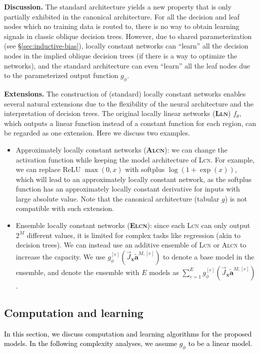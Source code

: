 \documentclass{article} \usepackage{iclr2020_conference,times}
\newcommand{\camera}[1]{\textcolor{black}{#1}}
\def\va{{\bm{a}}}
\def\vx{{\bm{x}}}
\newcommand{\xref}[1]{\S\ref{#1}}
\begin{document}
\textbf{Discussion.} The standard architecture yields a new property that is only partially exhibited in the canonical architecture. For all the decision and leaf nodes which no training data is routed to, there is no way to obtain learning signals in classic oblique decision trees. However, due to shared parameterization (see \xref{sec:inductive-bias}), locally constant networks can ``learn'' all the decision nodes in the implied oblique decision trees (if there is a way to optimize the networks), and the standard architecture can even ``learn'' all the leaf nodes due to the parameterized output function $g_\phi$.


\textbf{Extensions.} The construction of (standard) locally constant networks enables several natural extensions due to the flexibility of the neural architecture and the interpretation of decision trees. The original locally linear networks (\textbf{\textsc{Lln}}) $f_\theta$, which outputs a linear function instead of a constant function for each region, can be regarded as one extension. Here we discuss two examples.
\begin{itemize}[leftmargin=4mm]
\vspace{-2mm}
    \item {Approximately locally constant networks (\textbf{\textsc{Alcn}})}: we can change the activation function while keeping the model architecture of \textsc{Lcn}. For example, we can replace ReLU $\max(0, x)$ with softplus $\log(1 + \exp(x))$, which will lead to an approximately locally constant network, as the softplus function has an approximately locally constant derivative for inputs with large absolute value. Note that the canonical architecture (tabular $g$) is not compatible with such extension. 
\vspace{-1mm}
    \item Ensemble locally constant networks (\textbf{\textsc{Elcn}}): since each \textsc{Lcn} can only output $2^M$ different values, it is limited for complex tasks like regression (akin to decision trees). We can instead use an additive ensemble of \textsc{Lcn} or \textsc{Alcn} to increase the capacity. We use $g^{[e]}_{\phi}(\vec{J}_\vx \tilde \va^{M, [e]})$ to denote a base model in the ensemble, and denote the ensemble with $E$ models as $\sum_{e=1}^E g^{[e]}_{\phi}(\vec{J}_\vx \tilde \va^{M, [e]})$. 
\vspace{-2mm}
\end{itemize}
 \vspace{-1mm}
\subsection{Computation and learning}\label{sec:learning}
\vspace{-1mm}
\camera{In this section, we discuss computation and learning algorithms for the proposed models. In the following complexity analyses, we assume $g_\phi$ to be a linear model.}
\end{document}
